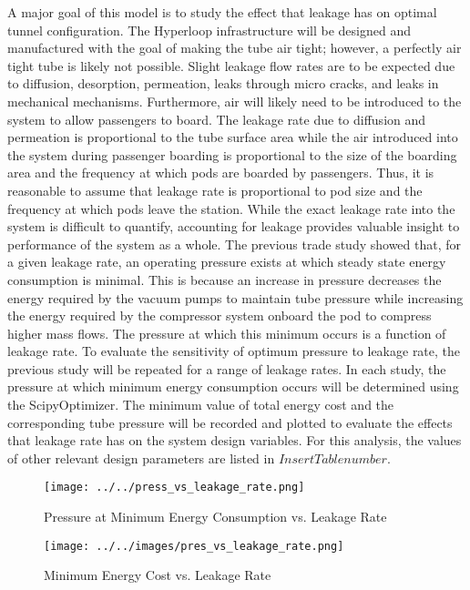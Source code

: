 A major goal of this model is to study the effect that leakage has on optimal tunnel configuration. The Hyperloop infrastructure will be designed and manufactured with the goal of making the tube air tight; however, a perfectly air tight tube is likely not possible. Slight leakage flow rates are to be expected due to diffusion, desorption, permeation, leaks through micro cracks, and leaks in mechanical mechanisms. Furthermore, air will likely need to be introduced to the system to allow passengers to board. The leakage rate due to diffusion and permeation is proportional to the tube surface area while the air introduced into the system during passenger boarding is proportional to the size of the boarding area and the frequency at which pods are boarded by passengers. Thus, it is reasonable to assume that leakage rate is proportional to pod size and the frequency at which pods leave the station. While the exact leakage rate into the system is difficult to quantify, accounting for leakage provides valuable insight to performance of the system as a whole.
The previous trade study showed that, for a given leakage rate, an operating pressure exists at which steady state energy consumption is minimal. This is because an increase in pressure decreases the energy required by the vacuum pumps to maintain tube pressure while increasing the energy required by the compressor system onboard the pod to compress higher mass flows. The pressure at which this minimum occurs is a function of leakage rate. To evaluate the sensitivity of optimum pressure to leakage rate, the previous study will be repeated for a range of leakage rates. In each study, the pressure at which minimum energy consumption occurs will be determined using the ScipyOptimizer. The minimum value of total energy cost and the corresponding tube pressure will be recorded and plotted to evaluate the effects that leakage rate has on the system design variables. For this analysis, the values of other relevant design parameters are listed in $Insert Table number$.
\begin{figure}
	\centering
	\texttt{[image: ../../press\_vs\_leakage\_rate.png]}
	\caption{Pressure at Minimum Energy Consumption vs. Leakage Rate}
	\label{fig:pres_vs_leakage_rate}
\end{figure}
\begin{figure}
	\centering
	\texttt{[image: ../../images/pres\_vs\_leakage\_rate.png]}
	\caption{Minimum Energy Cost vs. Leakage Rate}
	\label{fig:pres_vs_leakage_rate}
\end{figure}
